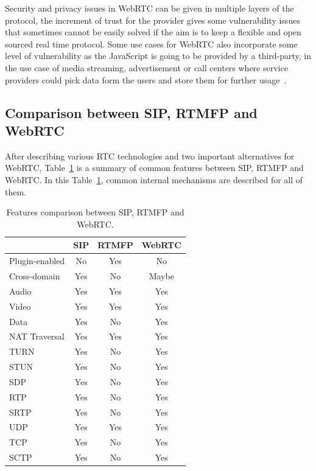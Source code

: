 Security and privacy issues in WebRTC can be given in multiple layers of the protocol, the increment of trust for the provider gives some vulnerability issues that sometimes cannot be easily solved if the aim is to keep a flexible and open sourced real time protocol. Some use cases for WebRTC also incorporate some level of vulnerability as the JavaScript is going to be provided by a third-party, in the use case of media streaming, advertisement or call centers where service providers could pick data form the users and store them for further usage~\cite{WebRTCcasesIETF}.

\subsection{Comparison between SIP, RTMFP and WebRTC}

After describing various RTC technologies and two important alternatives for WebRTC, Table~\ref{fig:CompareRTC} is a summary of common features between SIP, RTMFP and WebRTC. In this Table~\ref{fig:CompareRTC}, common internal mechanisms are described for all of them.

\begin{table}[h]
\begin{center}
	\begin{tabular}{| l | c | c | c |}
	\hline
    	 & SIP & RTMFP & WebRTC \\ \hline
    	Plugin-enabled & No &Yes & No \\ \hline
    	Cross-domain & Yes & No & Maybe \\ \hline
    	Audio & Yes & Yes & Yes \\ \hline
    	Video & Yes & Yes & Yes \\ \hline
    	Data & Yes & No & Yes \\ \hline
	NAT Traversal & Yes & Yes & Yes \\ \hline
	\hline \hline
	TURN & Yes & No & Yes \\ \hline
    	STUN & Yes & No & Yes \\ \hline
    	SDP & Yes & No & Yes \\ \hline
    	RTP & Yes & No & Yes \\ \hline
    	SRTP & Yes & No & Yes \\ \hline
    	UDP & Yes & Yes & Yes \\ \hline
    	TCP & Yes & No & Yes \\ \hline
    	SCTP & Yes & No & Yes \\ \hline
	\end{tabular}
      \caption[Features comparison between SIP, RTMFP and WebRTC]{Features comparison between SIP, RTMFP and WebRTC.}
	\label{fig:CompareRTC}
\end{center}
\end{table}

